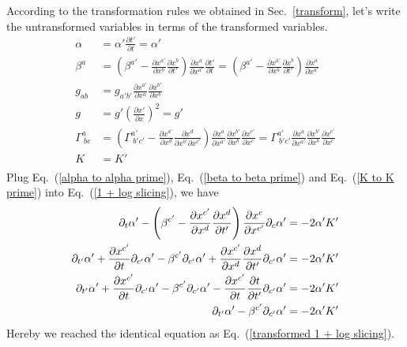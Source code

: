 According to the transformation rules we obtained in Sec.~\ref{transform}, let's write the untransformed variables in terms of the transformed variables. 
\begin{align}
\alpha & = \alpha'\frac{\partial t'}{\partial t} = \alpha'\label{alpha to alpha prime}\\
\beta^{a} & = \left(\beta^{a'} - \frac{\partial x^{a'}}{\partial x^{b}}\frac{\partial x^{b}}{\partial t'}\right)\frac{\partial x^{a}}{\partial x^{a'}}\frac{\partial t'}{\partial t} =   \left(\beta^{a'} - \frac{\partial x^{a'}}{\partial x^{b}}\frac{\partial x^{b}}{\partial t'}\right)\frac{\partial x^{a}}{\partial x^{a'}}\label{beta to beta prime}\\
g_{ab} & = g_{a'b'}\frac{\partial x^{a'}}{\partial x^{a}}\frac{\partial x^{b'}}{\partial x^{b}}\label{metric to metric prime}\\
g & = g'\left(\frac{\partial x'}{\partial x}\right)^{2} = g'\label{det to det prime}\\
\Gamma^{a}_{~bc} & = \left(\Gamma^{a'}_{~b'c'} - \frac{\partial x^{a'}}{\partial x^{d}}\frac{\partial x^{d}}{\partial x^{b'}\partial x^{c'}}\right)\frac{\partial x^{a}}{\partial x^{a'}}\frac{\partial x^{b'}}{\partial x^{b}}\frac{\partial x^{c'}}{\partial x^{c}} = \Gamma^{a'}_{~b'c'}\frac{\partial x^{a}}{\partial x^{a'}}\frac{\partial x^{b'}}{\partial x^{b}}\frac{\partial x^{c'}}{\partial x^{c}}\label{gamma to gamma prime}\\
K & = K'\label{K to K prime}\\
\end{align}
Plug Eq.~(\ref{alpha to alpha prime}), Eq.~(\ref{beta to beta prime}) and Eq.~(\ref{K to K prime}) into Eq.~(\ref{1 + log slicing}), we have
\begin{align}
\partial_{t}\alpha' - \left(\beta^{c'} - \frac{\partial x^{c'}}{\partial x^{d}}\frac{\partial x^{d}}{\partial t'}\right)\frac{\partial x^{c}}{\partial x^{c'}}\partial_{c}\alpha' & = -2\alpha' K'\notag\\
\partial_{t'}\alpha' + \frac{\partial x^{c'}}{\partial t}\partial_{c'}\alpha' - \beta^{c'}\partial_{c'}\alpha' + \frac{\partial x^{c'}}{\partial x^{d}}\frac{\partial x^{d}}{\partial t'}\partial_{c'}\alpha' & = -2\alpha' K'\notag\\
\partial_{t'}\alpha' + \frac{\partial x^{c'}}{\partial t}\partial_{c'}\alpha' - \beta^{c'}\partial_{c'}\alpha' - \frac{\partial x^{c'}}{\partial t}\frac{\partial t}{\partial t'}\partial_{c'}\alpha' & = -2\alpha' K'\notag\\
\partial_{t'}\alpha'  - \beta^{c'}\partial_{c'}\alpha' & = -2\alpha' K'
\end{align}
Hereby we reached the identical equation as Eq.~(\ref{transformed 1 + log slicing}).

